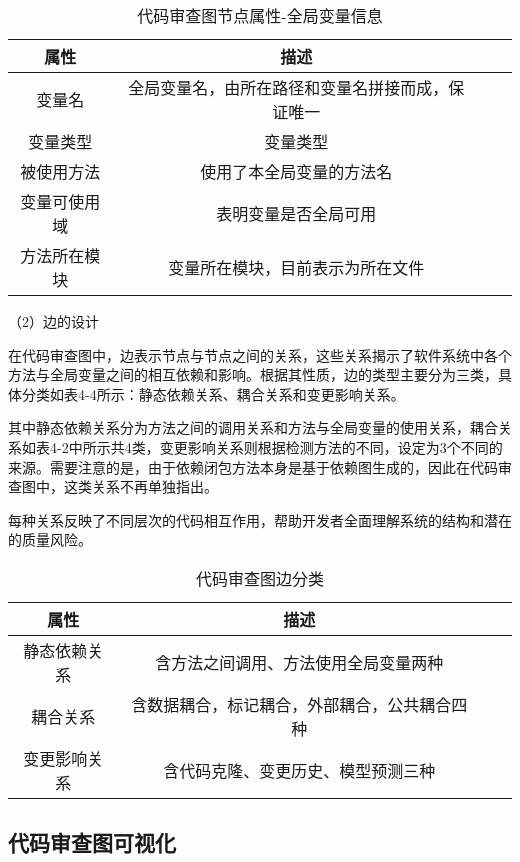 \begin{table}[htbp]
\caption{代码审查图节点属性-全局变量信息}
\vspace{0.5em}\centering\wuhao
\begin{tabular}{cccc}
\toprule
    属性 & 描述 \\
\midrule
变量名 & 全局变量名，由所在路径和变量名拼接而成，保证唯一  \\
变量类型 & 变量类型   \\
被使用方法 & 使用了本全局变量的方法名   \\
变量可使用域 & 表明变量是否全局可用   \\
方法所在模块 &  变量所在模块，目前表示为所在文件  \\  
\bottomrule
\end{tabular}
\end{table}


（2）边的设计

在代码审查图中，边表示节点与节点之间的关系，这些关系揭示了软件系统中各个方法与全局变量之间的相互依赖和影响。根据其性质，边的类型主要分为三类，具体分类如表4-4所示：静态依赖关系、耦合关系和变更影响关系。

其中静态依赖关系分为方法之间的调用关系和方法与全局变量的使用关系，耦合关系如表4-2中所示共4类，变更影响关系则根据检测方法的不同，设定为3个不同的来源。需要注意的是，由于依赖闭包方法本身是基于依赖图生成的，因此在代码审查图中，这类关系不再单独指出。

每种关系反映了不同层次的代码相互作用，帮助开发者全面理解系统的结构和潜在的质量风险。

\begin{table}[htbp]
\caption{代码审查图边分类}
\vspace{0.5em}\centering\wuhao
\begin{tabular}{cccc}
\toprule
属性 & 描述 \\
\midrule
静态依赖关系 & 含方法之间调用、方法使用全局变量两种  \\
耦合关系 & 含数据耦合，标记耦合，外部耦合，公共耦合四种   \\
变更影响关系 & 含代码克隆、变更历史、模型预测三种  \\
\bottomrule
\end{tabular}
\end{table}



\subsection{代码审查图可视化}

